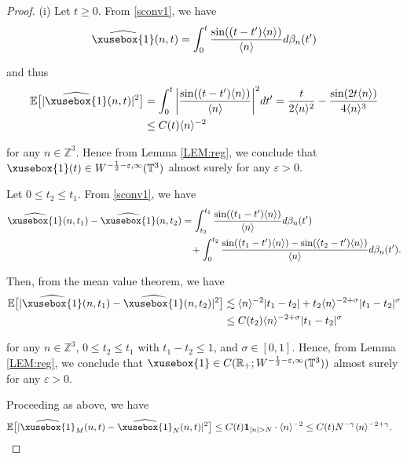 \documentclass[%
11pt,  reqno]{amsart}
\def\<#1>{\xusebox{#1}}
\newcommand{\1}{\hspace{0.2mm}\text{I}\hspace{0.2mm}}
\newcommand{\noi}{\noindent}
\newcommand{\Z}{\mathbb{Z}}
\newcommand{\R}{\mathbb{R}}
\newcommand{\T}{\mathbb{T}}
\newcommand{\E}{\mathbb{E}}
\newcommand{\be}{\beta}
\newcommand{\eps}{\varepsilon}
\newcommand{\g}{\gamma}
\newcommand{\s}{\sigma}
\newcommand{\ft}{\widehat}
\newcommand{\les}{\lesssim}
\newcommand{\jb}[1]
{\langle #1 \rangle}
\newcommand{\ind}{\mathbf 1}
\numberwithin{equation}{section}
\numberwithin{theorem}{section}
\begin{document}
\begin{proof}
(i) 
Let $t \geq 0$.
From \eqref{sconv1}, we have
\begin{align}
\ft{\<1>}(n, t)   = 
   \int_0^t \frac{\sin ((t - t') \jb{ n })}{\jb{ n }} d \beta_n (t')
\label{sconv2}
\end{align}

\noi
and thus
\begin{align}
\begin{split}
\E\big[|\ft{\<1>}(n, t)|^2\big] 
& = \int_0^t \bigg|\frac{\sin((t - t')\jb{n})}{\jb{n}}\bigg|^2 dt'
= \frac{t}{2\jb{n}^2} - \frac{\sin(2t \jb{n})}{4\jb{n}^3}\\
& \leq C(t) \jb{n}^{-2}
\end{split}
\label{sconv3}
\end{align}

\noi
for any $n \in \Z^3$.
Hence from Lemma \ref{LEM:reg}, 
we conclude that 
 $\<1>(t) \in W^{-\frac12 -\eps, \infty}(\T^3)$
 almost surely for any $\eps >0$.


Let  $0 \leq t_2 \leq t_1$. 
From \eqref{sconv1},  we have
\begin{align}
\begin{split}
\ft{\<1>}(n, t_1) - \ft{\<1>}(n, t_2)
& = \int_{t_2}^{t_1}
\frac{\sin((t_1 - t')\jb{n})}{\jb{n}}d\be_n(t')\\
& \hphantom{X}
+ \int_0^{t_2} 
\frac{\sin((t_1 - t')\jb{n}) - \sin((t_2 - t')\jb{n})}{\jb{n}} d\be_n(t').
\end{split}
\label{V0}
\end{align}

\noi
Then, from the mean value theorem,  we have
\begin{align}
\begin{split}
\E\big[|\ft{\<1>}(n, t_1) - \ft{\<1>}(n, t_2)|^2\big] 
& \les \jb{n}^{-2}|t_1 - t_2|
+ t_2 \jb{n}^{-2 + \s} |t_1 - t_2|^\s \\
& \leq C(t_2) \jb{n}^{-2 + \s} |t_1 - t_2|^\s
\end{split}
\label{V0a}
\end{align}

\noi
for any $n \in \Z^3$,   $0 \leq t_2 \leq t_1$ with $t_1 - t_2 \leq 1$, and  $\s \in [0, 1]$.
Hence, from Lemma \ref{LEM:reg}, 
we conclude that
 $\<1> \in C(\R_+; W^{-\frac12 -\eps, \infty}(\T^3))$
 almost surely
  for any $\eps > 0$.

Proceeding as above, we have
\begin{align*}
\E\big[|\ft{\<1>}_M(n, t) - \ft{\<1>}_N(n, t)|^2\big] 
& \leq C(t) \ind_{|n|> N} \cdot \jb{n}^{-2}
 \leq C(t) N^{-\g} \jb{n}^{-2+\g}.
\end{align*}



\end{proof}
\end{document}
